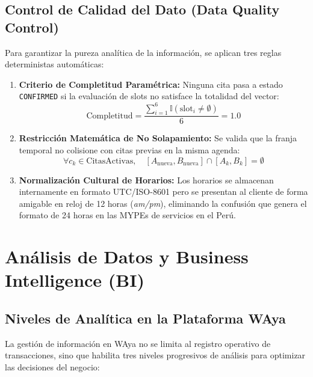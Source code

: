 \documentclass[12pt,a4paper]{report}
\begin{document}
\section{Control de Calidad del Dato (Data Quality Control)}
Para garantizar la pureza analítica de la información, se aplican tres reglas deterministas automáticas:
\begin{enumerate}[leftmargin=1.5em]
    \item \textbf{Criterio de Completitud Paramétrica:} Ninguna cita pasa a estado \texttt{CONFIRMED} si la evaluación de slots no satisface la totalidad del vector:
    \begin{equation}
        \text{Completitud} = \frac{\sum_{i=1}^{6} \mathbb{I}(\text{slot}_i \neq \emptyset)}{6} = 1.0
    \end{equation}
    \item \textbf{Restricción Matemática de No Solapamiento:} Se valida que la franja temporal no colisione con citas previas en la misma agenda:
    \begin{equation}
        \forall c_k \in \text{CitasActivas}, \quad [A_{\text{nueva}}, B_{\text{nueva}}] \cap [A_k, B_k] = \emptyset
    \end{equation}
    \item \textbf{Normalización Cultural de Horarios:} Los horarios se almacenan internamente en formato UTC/ISO-8601 pero se presentan al cliente de forma amigable en reloj de 12 horas (\textit{am/pm}), eliminando la confusión que genera el formato de 24 horas en las MYPEs de servicios en el Perú.
\end{enumerate}

\chapter{Análisis de Datos y Business Intelligence (BI)}

\section{Niveles de Analítica en la Plataforma WAya}
La gestión de información en WAya no se limita al registro operativo de transacciones, sino que habilita tres niveles progresivos de análisis para optimizar las decisiones del negocio:
\end{document}
